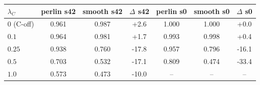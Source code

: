 \setlength{\tabcolsep}{3pt}
\begin{tabular}{@{}lcccccc@{}}
\toprule
$\lambda_C$ & perlin s42 & smooth s42 & $\Delta$ s42 & perlin s0 & smooth s0 & $\Delta$ s0 \\
\midrule
$0$ (C-off) & 0.961 & 0.987 & +2.6 & 1.000 & 1.000 & +0.0 \\
$0.1$ & 0.964 & 0.981 & +1.7 & 0.993 & 0.998 & +0.4 \\
$0.25$ & 0.938 & 0.760 & -17.8 & 0.957 & 0.796 & -16.1 \\
$0.5$ & 0.703 & 0.532 & -17.1 & 0.809 & 0.474 & -33.4 \\
$1.0$ & 0.573 & 0.473 & -10.0 & -- & -- & -- \\
\bottomrule
\end{tabular}
